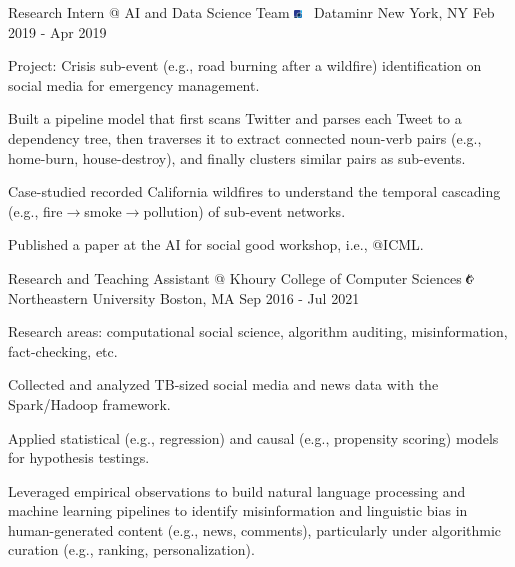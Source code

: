 \documentclass[letterpaper]{awesome-cv}
\begin{document}
\begin{cventries}
{\begin{cvitems}
      \end{cvitems}
    }
  \cventry
    {Research Intern @ AI and Data Science Team}
    {\includegraphics[width=0.016\textwidth]{../images/logos/dataminr.png}~ Dataminr}
    {New York, NY}
    {Feb 2019 - Apr 2019}
    {
      \begin{cvitems}
        \item {Project: Crisis sub-event (e.g., road burning after a wildfire) identification on social media for emergency management.}
        \item {Built a pipeline model that first scans Twitter and parses each Tweet to a dependency tree, then traverses it to extract connected noun-verb pairs (e.g., home-burn, house-destroy), and finally clusters similar pairs as sub-events.}
        \item {Case-studied recorded California wildfires to understand the temporal cascading (e.g., fire$\to$smoke$\to$pollution) of sub-event networks.}
        \item {Published a paper at the AI for social good workshop, i.e., @ICML.}
      \end{cvitems}
    }
  \cventry
    {Research and Teaching Assistant @ Khoury College of Computer Sciences}
    {\includegraphics[width=0.016\textwidth]{../images/logos/northeastern.png}~ Northeastern University}
    {Boston, MA}
    {Sep 2016 - Jul 2021}
    {
      \begin{cvitems}
        \item {Research areas: computational social science, algorithm auditing, misinformation, fact-checking, etc.}
        \item {Collected and analyzed TB-sized social media and news data with the Spark/Hadoop framework.}
        \item {Applied statistical (e.g., regression) and causal (e.g., propensity scoring) models for hypothesis testings.}
        \item {Leveraged empirical observations to build natural language processing and machine learning pipelines to identify misinformation and linguistic bias in human-generated content (e.g., news, comments), particularly under algorithmic curation (e.g., ranking, personalization).}

\end{cvitems}}
\end{cventries}
\end{document}
